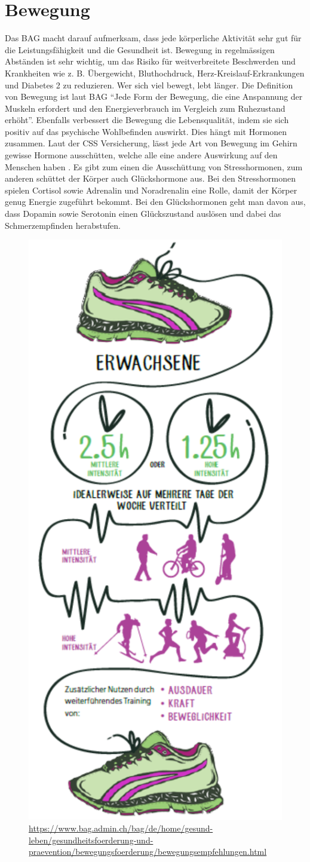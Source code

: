\section{Bewegung}
\authortoc{\bastian}{\sectionident}
Das BAG macht darauf aufmerksam, dass jede körperliche Aktivität sehr gut für die Leistungsfähigkeit und die Gesundheit ist. Bewegung in regelmässigen Abständen ist sehr wichtig, um das Risiko für weitverbreitete Beschwerden und Krankheiten wie z. B. Übergewicht, Bluthochdruck, Herz-Kreislauf-Erkrankungen und Diabetes 2 zu reduzieren.
\newline
Wer sich viel bewegt, lebt länger. Die Definition von Bewegung ist laut BAG “Jede Form der Bewegung, die eine Anspannung der Muskeln erfordert und den Energieverbrauch im Vergleich zum Ruhezustand erhöht”.
\newline
Ebenfalls verbessert die Bewegung die Lebensqualität, indem sie sich positiv auf das psychische Wohlbefinden auswirkt. Dies hängt mit Hormonen zusammen. Laut der CSS Versicherung, lässt jede Art von Bewegung im Gehirn gewisse Hormone ausschütten, welche alle eine andere Auswirkung auf den Menschen haben \cite{hormone-bei-bewegung}. Es gibt zum einen die Ausschüttung von Stresshormonen, zum anderen schüttet der Körper auch Glückshormone aus. Bei den Stresshormonen spielen Cortisol sowie Adrenalin und Noradrenalin eine Rolle, damit der Körper genug Energie zugeführt bekommt. Bei den Glückshormonen geht man davon aus, dass Dopamin sowie Serotonin einen Glückszustand auslösen und dabei das Schmerzempfinden herabstufen.
\newline
\begin{figure}[!ht]
  \centering
  \includegraphics[width=0.38\linewidth]{./images/bewegungsempfehlungen-ew-dt.png}
  \caption{Grafik von BAG zur Bewegungsempfehlung von Erwachsenen Menschen.}
  \label{fig:bewegungsempfehlungen}
  \caption*{\url{https://www.bag.admin.ch/bag/de/home/gesund-leben/gesundheitsfoerderung-und-praevention/bewegungsfoerderung/bewegungsempfehlungen.html}}
\end{figure}

